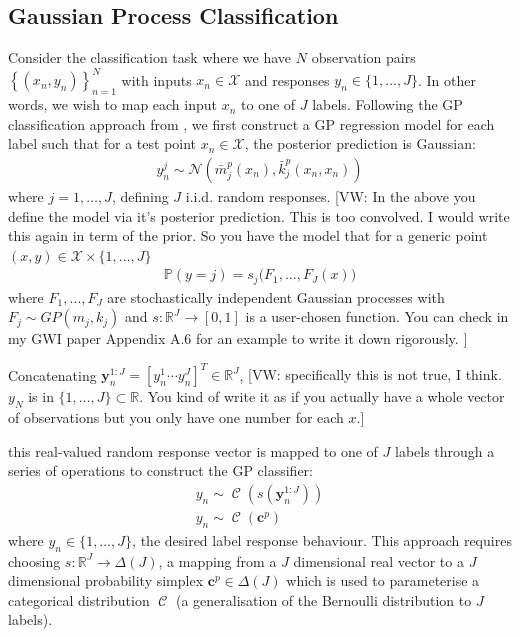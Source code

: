 \documentclass{article}
\newcommand{\vw}[1]{{\color{green} [VW: #1]}}
\newcommand{\calX}{\mathcal{X}}
\newcommand{\Cat}{\operatorname{\mathcal{C}}}
\numberwithin{equation}{section}
\begin{document}
\subsection{Gaussian Process Classification}\label{section:gp-classifiers}
Consider the classification task where we have $N$ observation pairs $\left\{(x_n, y_n)\right\}_{n=1}^{N}$ with inputs $x_n \in \mathcal{X}$ and responses $y_n \in \{1, \dots, J\}$. In other words, we wish to map each input $x_n$ to one of $J$ labels. Following the GP classification approach from \cite{matthews2017scalable}, we first construct a GP regression model for each label such that for a test point $x_n \in \mathcal{X}$, the posterior prediction is Gaussian:
\begin{align}
    y_n^j \sim \mathcal{N}\left(\bar{m}^p_j(x_n), \bar{k}^p_j(x_n, x_n)\right)
    \label{gp-classifier-regressors}
\end{align}
where $j=1, \dots, J$, defining $J$ i.i.d. random responses. \vw{In the above you define the model via it's posterior prediction. This is too convolved. I would write this again in term of the prior. So you have the model that for a generic point $(x,y) \in \calX \times \{1,\hdots, J\}$
\begin{align}
    \mathbb{P}( y = j ) = s_j\big( F_1, \hdots, F_J(x) \big)
\end{align}
where $F_1,\hdots, F_J$ are stochastically independent Gaussian processes with $F_j \sim GP(m_j,k_j)$ and $s:\mathbb{R}^J \to [0,1]$ is a user-chosen function. You can check in my GWI paper Appendix A.6 for an example to write it down rigorously.
}

Concatenating $\mathbf{y}_n^{1:J} = [y_n^1 \cdots y_n^J]^T \in \mathbb{R}^{J}$, \vw{specifically this is not true, I think. $y_N$ is in $\{1, \hdots, J \} \subset \mathbb{R}$. You kind of write it as if you actually have a whole vector of observations but you only have one number for each $x$.}

this real-valued random response vector is mapped to one of $J$ labels through a series of operations to construct the GP classifier:
\begin{align}
\label{gp-classifier}
y_n \sim \Cat \left(s\left(\mathbf{y}_n^{1:J}\right)\right) \\
y_n \sim \Cat \left(\mathbf{c}^p\right)
\label{gp-classifier}
\end{align}
where $y_n \in \{1, \dots, J\}$, the desired label response behaviour. This approach requires choosing $s: \mathbb{R}^J \rightarrow \Delta(J)$, a mapping from a $J$ dimensional real vector to a $J$ dimensional probability simplex $\mathbf{c}^p \in \Delta(J)$ which is used to parameterise a categorical distribution $\Cat$ (a generalisation of the Bernoulli distribution to $J$ labels).
\end{document}
